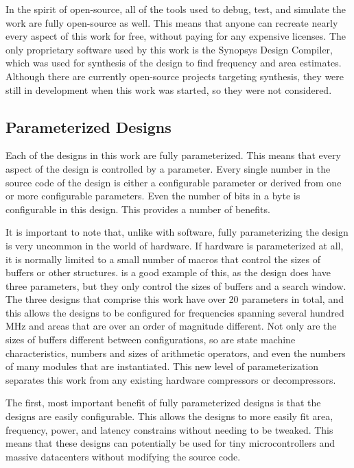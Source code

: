 \documentclass[doublespace,nopageskip]{VTthesis}
\begin{document}
In the spirit of open-source, all of the tools used to debug, test, and simulate the work are fully open-source as well. This means that anyone can recreate nearly every aspect of this work for free, without paying for any expensive licenses. The only proprietary software used by this work is the Synopsys Design Compiler, which was used for synthesis of the design to find frequency and area estimates. Although there are currently open-source projects targeting synthesis, they were still in development when this work was started, so they were not considered.

\subsection{Parameterized Designs}\label{ss:parameterized}
Each of the designs in this work are fully parameterized. This means that every aspect of the design is controlled by a parameter. Every single number in the source code of the design is either a configurable parameter or derived from one or more configurable parameters. Even the number of bits in a byte is configurable in this design. This provides a number of benefits.

It is important to note that, unlike with software, fully parameterizing the design is very uncommon in the world of hardware. If hardware is parameterized at all, it is normally limited to a small number of macros that control the sizes of buffers or other structures. \cite{hdldeflate} is a good example of this, as the design does have three parameters, but they only control the sizes of buffers and a search window. The three designs that comprise this work have over 20 parameters in total, and this allows the designs to be configured for frequencies spanning several hundred MHz and areas that are over an order of magnitude different. Not only are the sizes of buffers different between configurations, so are state machine characteristics, numbers and sizes of arithmetic operators, and even the numbers of many modules that are instantiated. This new level of parameterization separates this work from any existing hardware compressors or decompressors.

The first, most important benefit of fully parameterized designs is that the designs are easily configurable. This allows the designs to more easily fit area, frequency, power, and latency constrains without needing to be tweaked. This means that these designs can potentially be used for tiny microcontrollers and massive datacenters without modifying the source code.
\end{document}
